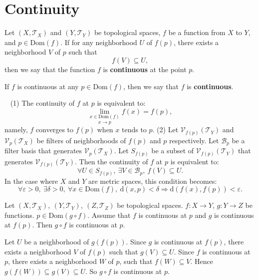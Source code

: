 \section{Continuity}
\begin{definitionenv}
    Let $(X,\mathscr{T}_X)$ and $(Y,\mathscr{T}_Y)$ be topological spaces, $f$ be a function from $X$ to $Y$, and $p\in \mathrm{Dom}(f)$. If for any neighborhood $U$ of $f(p)$, there exists a neighborhood $V$ of $p$ such that 
    $$f(V)\subseteq U,$$
    then we say that the function $f$ is \textbf{continuous} at the point $p$. 
    
    If $f$ is continuous at any $p\in \mathrm{Dom}(f)$, then we say that $f$ is \textbf{continuous}.
\end{definitionenv}
\begin{remark}
    \ \newline
    (1) The continuity of $f$ at $p$ is equivalent to:
    $$\underset{x\rightarrow p}{\lim_{x\in \mathrm{Dom}(f)}}f(x)=f(p),$$
    namely, $f$ converges to $f(p)$ when $x$ tends to $p$.
    \newline
    (2) Let $\mathcal{V}_{f(p)}\left(\mathscr{T}_Y\right)$ and $\mathcal{V}_{p}\left(\mathscr{T}_X\right)$ be filters of neighborhoods of $f(p)$ and $p$ respectively. Let $\mathcal{B}_p$ be a filter basis that generates $\mathcal{V}_p\left(\mathscr{T}_X\right)$. Let $S_{f(p)}$ be a subset of $\mathcal{V}_{f(p)}\left(\mathscr{T}_Y\right)$ that generates $\mathcal{V}_{f(p)}\left(\mathscr{T}_Y\right)$. Then the continuity of $f$ at $p$ is equivalent to:
    $$\forall U\in S_{f(p)},\ \exists V\in \mathcal{B}_p,\ f(V)\subseteq U.$$
    In the case where $X$ and $Y$ are metric spaces, this condition becomes:
    $$\forall \varepsilon >0,\ \exists \delta>0,\ \forall x\in \mathrm{Dom}(f),\ \mathrm{d}(x,p)<\delta\Rightarrow \mathrm{d}(f(x),f(p))<\varepsilon.$$
\end{remark}
\begin{propositionenv}
    Let $(X,\mathscr{T}_X),\ (Y,\mathscr{T}_Y),\ (Z,\mathscr{T}_Z)$ be topological spaces. $f: X\longrightarrow Y$, $g: Y\longrightarrow Z$ be functions. $p\in \mathrm{Dom}(g\circ f)$. Assume that $f$ is continuous at $p$ and $g$ is continuous at $f(p)$. Then $g\circ f$ is continuous at $p$.
\end{propositionenv}
\begin{proofenv}
    Let $U$ be a neighborhood of $g\left(f\left(p\right)\right)$. Since $g$ is continuous at $f(p)$, there exists a neighborhood $V$ of $f(p)$ such that $g(V)\subseteq U$. Since $f$ is continuous at $p$, there exists a neighborhood $W$ of $p$, such that $f(W)\subseteq V$. Hence $g\left(f\left(W\right)\right)\subseteq g\left(V\right)\subseteq U.$ So $g\circ f$ is continuous at $p$.
\end{proofenv}
